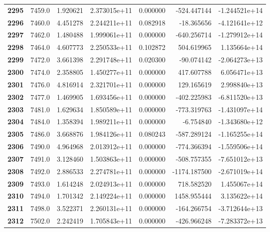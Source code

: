 \documentclass{report}[12pt]
\begin{document}
\begin{center}
\begin{tabular}{lrrrrrr}
\textbf{2295} &         7459.0 &   1.920621 &  2.373015e+11 &    0.000000 &  -524.447144 & -1.244521e+14 \\
\textbf{2296} &         7460.0 &   4.451278 &  2.244211e+11 &    0.082918 &   -18.365656 & -4.121641e+12 \\
\textbf{2297} &         7462.0 &   1.480488 &  1.999061e+11 &    0.000000 &  -640.256714 & -1.279912e+14 \\
\textbf{2298} &         7464.0 &   4.607773 &  2.250533e+11 &    0.102872 &   504.619965 &  1.135664e+14 \\
\textbf{2299} &         7472.0 &   3.661398 &  2.291748e+11 &    0.020300 &   -90.074142 & -2.064273e+13 \\
\textbf{2300} &         7474.0 &   2.358805 &  1.450277e+11 &    0.000000 &   417.607788 &  6.056471e+13 \\
\textbf{2301} &         7476.0 &   4.816914 &  2.321701e+11 &    0.000000 &   129.165619 &  2.998840e+13 \\
\textbf{2302} &         7477.0 &   1.469905 &  1.693456e+11 &    0.000000 &  -402.225983 & -6.811520e+13 \\
\textbf{2303} &         7481.0 &   1.629634 &  1.850589e+11 &    0.000000 &  -773.319763 & -1.431097e+14 \\
\textbf{2304} &         7484.0 &   1.358394 &  1.989211e+11 &    0.000000 &    -6.754840 & -1.343680e+12 \\
\textbf{2305} &         7486.0 &   3.668876 &  1.984126e+11 &    0.080243 &  -587.289124 & -1.165255e+14 \\
\textbf{2306} &         7490.0 &   4.964968 &  2.013912e+11 &    0.000000 &  -774.366394 & -1.559506e+14 \\
\textbf{2307} &         7491.0 &   3.128460 &  1.503863e+11 &    0.000000 &  -508.757355 & -7.651012e+13 \\
\textbf{2308} &         7492.0 &   2.886533 &  2.274781e+11 &    0.000000 & -1174.187500 & -2.671019e+14 \\
\textbf{2309} &         7493.0 &   1.614248 &  2.024913e+11 &    0.000000 &   718.582520 &  1.455067e+14 \\
\textbf{2310} &         7494.0 &   1.701342 &  2.149224e+11 &    0.000000 &  1458.955444 &  3.135622e+14 \\
\textbf{2311} &         7498.0 &   3.522371 &  2.260131e+11 &    0.000000 &  -164.266754 & -3.712644e+13 \\
\textbf{2312} &         7502.0 &   2.242419 &  1.705843e+11 &    0.000000 &  -426.966248 & -7.283372e+13 \\

\end{tabular}
\end{center}
\end{document}
